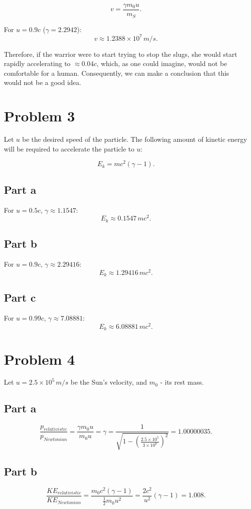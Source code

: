 \documentclass{article}
\begin{document}
\[
v = \frac{\gamma m_0u}{m_S}.
\]

For $u = 0.9c$ ($\gamma = 2.2942$):
\[
v \approx 1.2388\times10^7 \,m/s.
\]

Therefore, if the warrior were to start trying to stop the slugs, she would start rapidly accelerating to $\approx 0.04c$, which, as one could imagine, would not be comfortable for a human. Consequently, we can make a conclusion that this would not be a good idea.

\section*{Problem 3}
Let $u$ be the desired speed of the particle. The following amount of kinetic energy will be required to accelerate the particle to $u$:

\[
E_k = mc^2(\gamma - 1).
\]

\subsection*{Part a}
For $u = 0.5c$, $\gamma \approx 1.1547$:
\[
E_k \approx 0.1547\,mc^2.
\]

\subsection*{Part b}
For $u = 0.9c$, $\gamma \approx 2.29416$:
\[
E_k \approx 1.29416\,mc^2.
\]

\subsection*{Part c}
For $u = 0.99c$, $\gamma \approx 7.08881$:
\[
E_k \approx 6.08881\,mc^2.
\]

\section*{Problem 4}
Let $u = 2.5 \times 10^5\,m/s$ be the Sun's velocity, and $m_0$ - its rest mass.

\subsection*{Part a}
\[
\frac{p_{relativistic}}{p_{Newtonian}} = \frac{\gamma m_0u}{m_0 u} = \gamma = \frac{1}{\sqrt{1 - (\frac{2.5\times10^5}{3\times10^8})^2}} = 1.00000035.
\]

\subsection*{Part b}
\[
\frac{KE_{relativistic}}{KE_{Newtonian}} = \frac{m_0c^2(\gamma - 1)}{\frac{1}{2}m_0u^2} = \frac{2c^2}{u^2}(\gamma - 1) = 1.008.
\]
\end{document}
